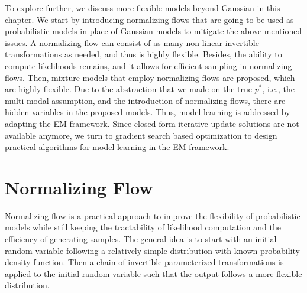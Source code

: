 To explore further, we discuss more flexible models beyond Gaussian in this chapter. We start by introducing normalizing flows that are going to be used as probabilistic models in place of Gaussian models to mitigate the above-mentioned issues. A normalizing flow can consist of as many non-linear invertible transformations as needed, and thus is highly flexible. Besides, the ability to compute likelihoods remains, and it allows for efficient sampling in normalizing flows. Then, mixture models that employ normalizing flows are proposed, which are highly flexible. Due to the abstraction that we made on the true $p^{\ast}$, i.e., the multi-modal assumption, and the introduction of normalizing flows, there are hidden variables in the proposed models. Thus, model learning is addressed by adapting the EM framework. Since closed-form iterative update solutions are not available anymore, we turn to gradient search based optimization to design practical algorithms for model learning in the EM framework.


\section{Normalizing Flow}
\label{chpt6:sec:flow}
Normalizing flow is a practical approach to improve the flexibility of probabilistic models while still keeping the tractability of likelihood computation and the efficiency of generating samples. The general idea is to start with an initial random variable following a relatively simple distribution with known probability density function. Then a chain of invertible parameterized transformations is applied to the initial random variable such that the output follows a more flexible distribution.

